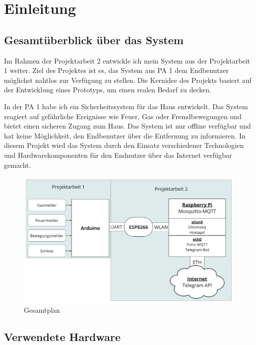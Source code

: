 \documentclass[12pt, letterpaper]{article}
\author{Oleksii Baida}
\date{Mai 2024}
\begin{document}


\tableofcontents
\pagebreak

\section{Einleitung}
\subsection{Gesamtüberblick über das System}
\par Im Rahmen der Projektarbeit 2 entwickle ich mein System aus der Projektarbeit 1 weiter. Ziel des Projektes ist es, das System aus PA 1 dem Endbenutzer möglichst nahtlos zur Verfügung zu stellen. Die Kernidee des Projekts basiert auf der Entwicklung eines Prototyps, um einen realen Bedarf zu decken.
\par In der PA 1 habe ich ein Sicherheitssystem für das Haus entwickelt. Das System reagiert auf gefährliche Ereignisse wie Feuer, Gas oder Fremdbewegungen und bietet einen sicheren Zugang zum Haus. Das System ist nur offline verfügbar und hat keine Möglichkeit, den Endbenutzer über die Entfernung zu informieren. In diesem Projekt wird das System durch den Einsatz verschiedener Technologien und Hardwarekomponenten für den Endnutzer über das Internet verfügbar gemacht.
\begin{figure}[h]
  \centering
  \includegraphics[width=\textwidth]{gesamtplan.jpg}
  \caption{Gesamtplan}
  \label{abb:gesamtplan}
\end{figure}
\subsection{Verwendete Hardware}
\end{document}
